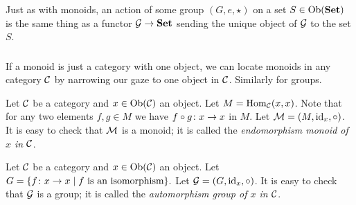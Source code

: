 \documentclass[CT4S-EN-RU]{subfiles}
\begin{document}
\begin{theoremRUS}\label{thm:grp to cat}
\end{theoremRUS}

\begin{blockENG}
Just as with monoids, an action of some group $(G,e,\star)$ on a set $S\in\textnormal{Ob}({\bf Set})$ is the same thing as a functor $\mathcal{G}\rightarrow{\bf Set}$ sending the unique object of $\mathcal{G}$ to the set $S$. 
\end{blockENG}

\begin{blockRUS}
\end{blockRUS}


\subsubsection{}

\begin{blockENG}
If a monoid is just a category with one object, we can locate monoids in any category $\mathcal{C}$ by narrowing our gaze to one object in $\mathcal{C}$. Similarly for groups.
\end{blockENG}

\begin{blockRUS}
\end{blockRUS}

\begin{exampleENG}
Let $\mathcal{C}$ be a category and $x\in\textnormal{Ob}(\mathcal{C})$ an object. Let $M=\textnormal{Hom}_\mathcal{C}(x,x)$. Note that for any two elements $f,g\in M$ we have $f\circ g\colon x\rightarrow x$ in $M$. Let $\mathcal{M}=(M,\textnormal{id}_x,\circ)$. It is easy to check that $\mathcal{M}$ is a monoid; it is called the {\em endomorphism monoid of $x$ in $\mathcal{C}$}.
\end{exampleENG}

\begin{exampleRUS}
\end{exampleRUS}

\begin{exampleENG}
Let $\mathcal{C}$ be a category and $x\in\textnormal{Ob}(\mathcal{C})$ an object. Let $G=\{f\colon x\rightarrow x{\;|\;}f\textnormal{ is an isomorphism}\}.$ Let $\mathcal{G}=(G,\textnormal{id}_x,\circ)$. It is easy to check that $\mathcal{G}$ is a group; it is called the {\em automorphism group of $x$ in $\mathcal{C}$}.
\end{exampleENG}
\end{document}
